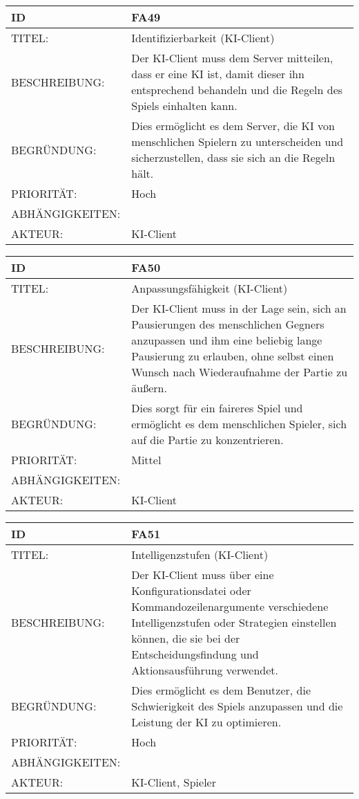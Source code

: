 \documentclass{uulm-assignment}
\begin{document}
    \begin{tabularx}{\textwidth}{|l|X |} \hline
        \textbf{ID} & \textbf{FA49} \\
        \hline
        TITEL: & Identifizierbarkeit (KI-Client)\\
        \hline
        BESCHREIBUNG: &  Der KI-Client muss dem Server mitteilen, dass er eine KI ist, damit dieser ihn entsprechend behandeln und die Regeln des Spiels einhalten kann.  
        \\
        \hline
        BEGRÜNDUNG: & Dies ermöglicht es dem Server, die KI von menschlichen Spielern zu unterscheiden und sicherzustellen, dass sie sich an die Regeln hält.\\
        \hline
        PRIORITÄT: & Hoch\\
        \hline
        ABHÄNGIGKEITEN: &  \\
        \hline
        AKTEUR: & KI-Client\\
        \hline
    \end{tabularx}
    
    \begin{tabularx}{\textwidth}{|l|X |} \hline
        \textbf{ID} & \textbf{FA50} \\
        \hline
        TITEL: & Anpassungsfähigkeit (KI-Client) \\
        \hline
        BESCHREIBUNG: & Der KI-Client muss in der Lage sein, sich an Pausierungen des menschlichen Gegners anzupassen und ihm eine beliebig lange Pausierung zu erlauben, ohne selbst einen Wunsch nach Wiederaufnahme der Partie zu äußern. 
        \\
        \hline
        BEGRÜNDUNG: &  Dies sorgt für ein faireres Spiel und ermöglicht es dem menschlichen Spieler, sich auf die Partie zu konzentrieren.\\
        \hline
        PRIORITÄT: & Mittel\\
        \hline
        ABHÄNGIGKEITEN: &  \\
        \hline
        AKTEUR: & KI-Client\\
        \hline
    \end{tabularx}
    
    \begin{tabularx}{\textwidth}{|l|X |} \hline
        \textbf{ID} & \textbf{FA51} \\
        \hline
        TITEL: & Intelligenzstufen (KI-Client)\\
        \hline
        BESCHREIBUNG: & Der KI-Client muss über eine Konfigurationsdatei oder Kommandozeilenargumente verschiedene Intelligenzstufen oder Strategien einstellen können, die sie bei der Entscheidungsfindung und Aktionsausführung verwendet. 
        \\
        \hline
        BEGRÜNDUNG: &  Dies ermöglicht es dem Benutzer, die Schwierigkeit des Spiels anzupassen und die Leistung der KI zu optimieren.\\
        \hline
        PRIORITÄT: & Hoch\\
        \hline
        ABHÄNGIGKEITEN: &  \\
        \hline
        AKTEUR: & KI-Client, Spieler\\
        \hline
    \end{tabularx}
    
\end{document}
